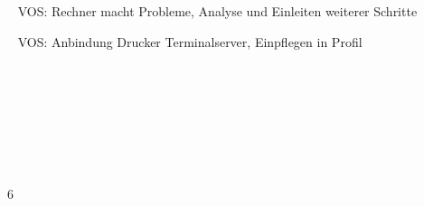 {{	\textbullet~ VOS: Rechner macht Probleme, Analyse und Einleiten weiterer Schritte\par
	\textbullet~ VOS: Anbindung Drucker Terminalserver, Einpflegen in Profil\par
	\textbullet~ \par
	\textbullet~ \par
	\textbullet~ \par
	\textbullet~ 
	}{}{6}
}{}
\Unterschrift
\newpage
